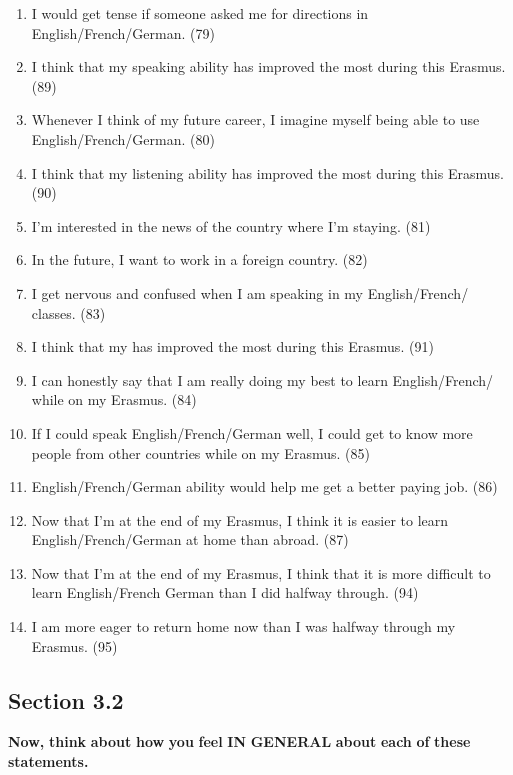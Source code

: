 \documentclass[output=paper]{langsci/langscibook}
\begin{document}
\begin{enumerate}
\item  I would get tense if someone asked me for directions in {English}/French/{German}. (79)
\item  I think that my speaking ability has improved the most during this Erasmus. (89)
\item  Whenever I think of my future career, I imagine myself being able to use {English}/French/{Ger\-man}. (80)
\item  I think that my listening ability has improved the most during this Erasmus. (90)
\item  I’m interested in the news of the country where I’m staying. (81)
\item  In the future, I want to work in a foreign country. (82)
\item  I get nervous and confused when I am speaking in my {English}/French/ classes. (83)
\item  I think that my  has improved the most during this Erasmus. (91)
\item  I can honestly say that I am really doing my best to learn {English}/French/ while on my Erasmus. (84)
\item  If I could speak {English}/French/{German} well, I could get to know more people from other countries while on my Erasmus. (85)
\item  {English}/French/{German} ability would help me get a better paying job. (86)
\item  Now that I'm at the end of my Erasmus, I think it is easier to learn {English}/French/{German} at home than abroad. (87)
\item  Now that I'm at the end of my Erasmus, I think that it is more difficult to learn {English}/French {German} than I did halfway through. (94)
\item  I am more eager to return home now than I was halfway through my Erasmus. (95)
\end{enumerate}

\subsection*{Section 3.2}

\textbf{Now,} \textbf{think} \textbf{about} \textbf{how} \textbf{you} \textbf{feel} \textbf{IN} \textbf{GENERAL} \textbf{about} \textbf{each} \textbf{of} \textbf{these} \textbf{statements.}
\end{document}
